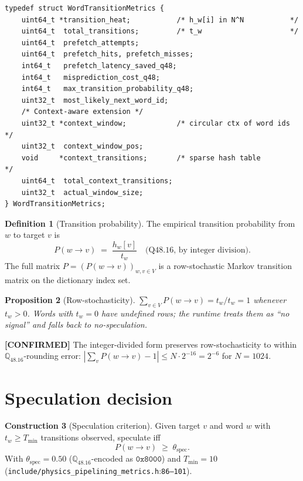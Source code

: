 \documentclass[11pt,letterpaper,openany]{book}
\theoremstyle{definition}
\newtheorem{definition}{Definition}[chapter]
\newtheorem{construction}[definition]{Construction}
\theoremstyle{plain}
\newtheorem{proposition}[definition]{Proposition}
\newcommand{\confirmed}{\textcolor{green!50!black}{\textbf{[CONFIRMED]}}\xspace}
\newcommand{\Qfp}{\mathbb{Q}_{48.16}}                %
\newcommand{\sourceref}[2]{\texttt{#1}:\texttt{#2}}
\begin{document}
\begin{lstlisting}[caption={Transition record
  (\texttt{include/physics\_pipelining\_metrics.h}:159--252).}]
typedef struct WordTransitionMetrics {
    uint64_t *transition_heat;           /* h_w[i] in N^N           */
    uint64_t  total_transitions;         /* t_w                     */
    uint64_t  prefetch_attempts;
    uint64_t  prefetch_hits, prefetch_misses;
    int64_t   prefetch_latency_saved_q48;
    int64_t   misprediction_cost_q48;
    int64_t   max_transition_probability_q48;
    uint32_t  most_likely_next_word_id;
    /* Context-aware extension */
    uint32_t *context_window;            /* circular ctx of word ids */
    uint32_t  context_window_pos;
    void     *context_transitions;       /* sparse hash table        */
    uint64_t  total_context_transitions;
    uint32_t  actual_window_size;
} WordTransitionMetrics;
\end{lstlisting}

\begin{definition}[Transition probability]\label{def:trans-prob}
The empirical transition probability from $w$ to target $v$ is
\begin{equation}\label{eq:trans-prob}
  P(w\to v) \;=\; \frac{h_w[v]}{t_w}\quad\text{(Q48.16, by integer division)}.
\end{equation}
The full matrix $P=(P(w\to v))_{w,v\in V}$ is a row-stochastic Markov
transition matrix on the dictionary index set.
\end{definition}

\begin{proposition}[Row-stochasticity]\label{prop:rowstoch}
$\sum_{v\in V} P(w\to v) = t_w / t_w = 1$ whenever $t_w > 0$. Words with
$t_w = 0$ have undefined rows; the runtime treats them as ``no signal''
and falls back to no-speculation.
\end{proposition}

\confirmed The integer-divided form preserves row-stochasticity to within
$\Qfp$-rounding error: $|\sum_v P(w\to v) - 1| \le N \cdot 2^{-16} = 2^{-6}$
for $N = 1024$.

\section{Speculation decision}

\begin{construction}[Speculation criterion]\label{con:speculate}
Given target $v$ and word $w$ with $t_w \ge T_{\min}$ transitions observed,
speculate iff
\[
  P(w\to v) \;\ge\; \theta_{\mathrm{spec}}.
\]
With $\theta_{\mathrm{spec}} = 0.50$ ($\Qfp$-encoded as $\mathtt{0x8000}$)
and $T_{\min} = 10$ (\sourceref{include/physics\_pipelining\_metrics.h}{86--101}).
\end{construction}
\end{document}
